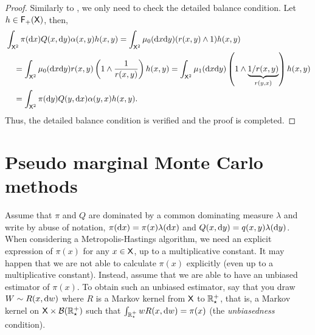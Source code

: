 \documentclass[english,graybox,envcountchap,envcountsame,sectrefs,shortlabels]{svmono}
\theoremstyle{style}
\newenvironment{svmultproof}{\small \begin{proof}}{\end{proof}}
\begin{document}
\begin{svmultproof}
Similarly to , we only need to check the detailed balance condition. Let $h\in\mathsf{F_{+}}(\mathsf{X})$, then,
\begin{align*}
&\int_{\mathsf{X}^2} \pi(\mathrm{d} x) Q(x,\mathrm{d} y) \alpha(x,y) h(x,y)=\int_{\mathsf{X}^2} \mu_0(\mathrm{d} x\mathrm{d} y) (r(x,y)\wedge 1)  h(x,y)
\\
&\quad =\int_{\mathsf{X}^2} \mu_0(\mathrm{d} x\mathrm{d} y) r(x,y)\left(1\wedge \frac{1}{r(x,y)}\right) h(x,y)=\int_{\mathsf{X}^2} \mu_1(\mathrm{d} x\mathrm{d} y) \left(1\wedge \underbrace{1/r(x,y)}_{r(y,x)}\right) h(x,y)\\
&\quad =\int_{\mathsf{X}^2} \pi(\mathrm{d} y) Q(y,\mathrm{d} x) \alpha(y,x) h(x,y).
\end{align*}
Thus, the detailed balance condition is verified and the proof is completed.
\end{svmultproof}



\section{Pseudo marginal Monte Carlo methods}
Assume that $\pi$ and $Q$ are dominated by a common dominating measure $\lambda$ and write by abuse of notation, $\pi(\mathrm{d} x)=\pi(x)\lambda(\mathrm{d} x)$ and $Q(x,\mathrm{d} y)=q(x,y)\lambda(\mathrm{d} y)$. When considering a Metropolis-Hastings algorithm, we need an explicit expression of $\pi(x)$ for any $x\in\mathsf{X}$, up to a multiplicative constant. It may happen that we are not able to calculate $\pi(x)$ explicitly (even up to a multiplicative constant). Instead, assume that we are able to have an unbiased estimator of $\pi(x)$. To obtain such an unbiased estimator, say that you draw $W\sim R(x,\mathrm{d} w)$ where $R$ is a Markov kernel from $\mathsf{X}$ to $\mathbb{R}^+_\star$, that is, a Markov kernel on $\mathsf{X}\times {\mathcal B}(\mathbb{R}^+_\star)$ such that $\int_{\mathbb{R}^+_\star} w R(x,\mathrm{d} w)=\pi(x)$ (the {\em unbiasedness} condition).
\end{document}
